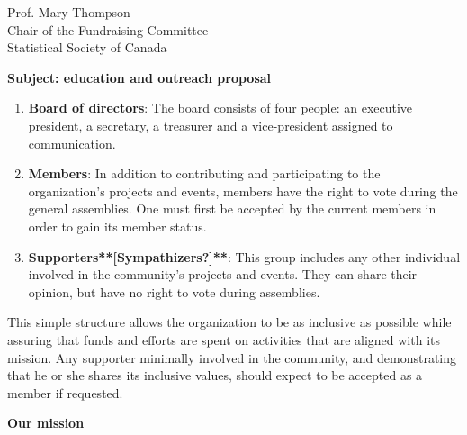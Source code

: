 \documentclass[11pt, a4paper]{letter} %
\begin{document}
\begin{letter}{
	Prof. Mary Thompson\\
	Chair of the Fundraising Committee\\
	Statistical Society of Canada
	
	\bigskip
	\textbf{Subject: education and outreach proposal}%
}
\begin{enumerate}
	\item[] \textbf{Board of directors}: The board consists of four people: an executive president, a secretary, a treasurer and a vice-president assigned to communication.
	\item[] \textbf{Members}: In addition to contributing and participating to the organization's projects and events, members have the right to vote during the general assemblies. One must first be accepted by the current members in order to gain its member status.
	\item[] \textbf{Supporters**[Sympathizers?]**}: This group includes any other individual involved in the community's projects and events. They can share their opinion, but have no right to vote during assemblies.
\end{enumerate}

This simple structure allows the organization to be as inclusive as possible while assuring that funds and efforts are spent on activities that are aligned with its mission. Any supporter minimally involved in the community, and demonstrating that he or she shares its inclusive values, should expect to be accepted as a member if requested.

\bigskip
\noindent \textbf{Our mission}


\end{letter}
\end{document}
